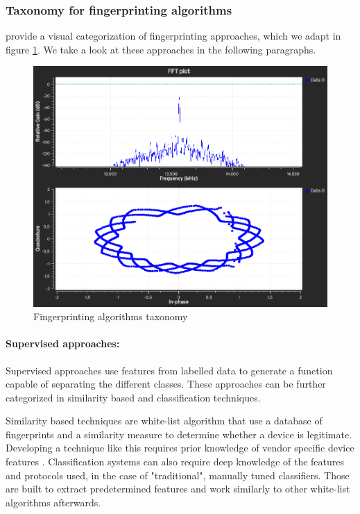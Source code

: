 \subsubsection{Taxonomy for fingerprinting algorithms}

\textcite{riyaz_deep_2018} provide a visual categorization of fingerprinting approaches, which we adapt in figure \ref{fig:algo-taxo}. We take a look at these approaches in the following paragraphs.

\begin{figure}[htp!]
  \centering
  \includegraphics[scale=0.3]{figures/grc_transient-flower.png}
  \caption{Fingerprinting algorithms taxonomy}
  \label{fig:algo-taxo}
\end{figure}

\paragraph{Supervised approaches:} Supervised approaches use features from labelled data to generate a function capable of separating the different classes. These approaches can be further categorized in similarity based and classification techniques.

Similarity based techniques are white-list algorithm that use a database of fingerprints and a similarity measure to determine whether a device is legitimate. Developing a technique like this requires prior knowledge of vendor specific device features \cite{riyaz_deep_2018}. Classification systems can also require deep knowledge of the features and protocols used, in the case of "traditional", manually tuned classifiers. Those are built to extract predetermined features and work similarly to other white-list algorithms afterwards.

